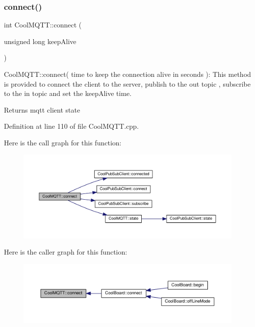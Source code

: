 \subsubsection{\texorpdfstring{connect()}{connect()}}
{\footnotesize\ttfamily int Cool\+M\+Q\+T\+T\+::connect (\begin{DoxyParamCaption}\item[{unsigned long}]{keep\+Alive }\end{DoxyParamCaption})}

Cool\+M\+Q\+T\+T\+::connect( time to keep the connection alive in seconds )\+: This method is provided to connect the client to the server, publish to the out topic , subscribe to the in topic and set the keep\+Alive time.

\begin{DoxyReturn}{Returns}
mqtt client state 
\end{DoxyReturn}


Definition at line 110 of file Cool\+M\+Q\+T\+T.\+cpp.

Here is the call graph for this function\+:\nopagebreak
\begin{figure}[H]
\begin{center}
\leavevmode
\includegraphics[width=350pt]{class_cool_m_q_t_t_a50075d0ab23a327ab897fd6adad20eda_cgraph}
\end{center}
\end{figure}
Here is the caller graph for this function\+:\nopagebreak
\begin{figure}[H]
\begin{center}
\leavevmode
\includegraphics[width=350pt]{class_cool_m_q_t_t_a50075d0ab23a327ab897fd6adad20eda_icgraph}
\end{center}
\end{figure}
\mbox{\label{class_cool_m_q_t_t_a373cc92fca7760d886f02d8a6e5b3f63}} 
